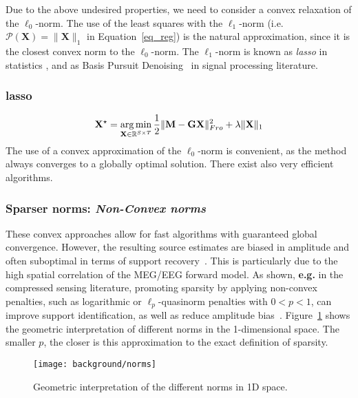 Due to the above undesired properties, we need to consider a convex relaxation of the $\ell_0$-norm. The use of the least squares with the $\ell_1$-norm (i.e. $\mathcal{P}(\mathbf{X})=\|\mathbf{X}\|_1$ in Equation~\eqref{eq_reg}) is the natural approximation, since it is the closest convex norm to the $\ell_0$-norm. The $\ell_1$-norm is known as \textit{\ac{lasso}} in statistics \cite{tibshirani1996regression}, and as Basis Pursuit Denoising~\cite{chen2001atomic} in signal processing literature.

\adjustwidth{1em}{0pt}
\subsubsection*{\ac{lasso}}
\begin{equation} \label{eq_lasso}
	\mathbf{X}^\star = \mathop{\mathrm{arg}\,\mathrm{min}}_{\mathbf{X}\in\mathbb{R}^{S\times T}}\frac{1}{2}\|\mathbf{M}-\mathbf{GX}\|_{Fro}^2 + \lambda\|\mathbf{X}\|_1
\end{equation}
\endadjustwidth
The use of a convex approximation of the $\ell_0$-norm is convenient, as the method always converges to a globally optimal solution. There exist also very efficient algorithms.

\subsubsection*{Sparser norms: \textit{Non-Convex norms}}
These convex approaches allow for fast algorithms with guaranteed global convergence. However, the resulting source estimates are biased in amplitude and often suboptimal in terms of support recovery~\cite{candes2008enhancing}. This is particularly due to the high spatial correlation of the MEG/EEG forward model. As shown, \textbf{e.g.} in the compressed sensing literature, promoting sparsity by applying non-convex penalties, such as logarithmic or $\ell_p$-quasinorm penalties with $0 < p < 1$, can improve support identification, as well as reduce amplitude bias~\cite{candes2008enhancing,chartrand2007exact,saab2008stable}. Figure~\ref{fig:norms} shows the geometric interpretation of different norms in the 1-dimensional space. The smaller $p$, the closer is this approximation to the exact definition of sparsity. 

\begin{figure}
\centering
	\texttt{[image: background/norms]}
    \caption{Geometric interpretation of the different norms in 1D space.}
	\label{fig:norms}
\end{figure}

